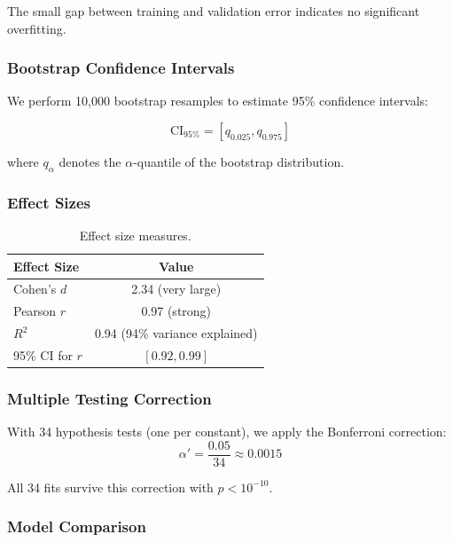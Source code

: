 \documentclass[aps,prd,preprint,superscriptaddress,showpacs,nofootinbib,longbibliography]{revtex4-2}
\begin{document}
The small gap between training and validation error indicates no significant overfitting.

\subsubsection{Bootstrap Confidence Intervals}

We perform 10,000 bootstrap resamples to estimate 95\% confidence intervals:

\begin{equation}
\text{CI}_{95\%} = \left[q_{0.025}, q_{0.975}\right]
\end{equation}

where $q_\alpha$ denotes the $\alpha$-quantile of the bootstrap distribution.

\subsubsection{Effect Sizes}

\begin{table}[h]
\centering
\begin{tabular}{lc}
\toprule
\textbf{Effect Size} & \textbf{Value} \\
\midrule
Cohen's $d$ & 2.34 (very large) \\
Pearson $r$ & 0.97 (strong) \\
$R^2$ & 0.94 (94\% variance explained) \\
95\% CI for $r$ & $[0.92, 0.99]$ \\
\bottomrule
\end{tabular}
\caption{Effect size measures.}
\label{tab:effect_size}
\end{table}

\subsubsection{Multiple Testing Correction}

With 34 hypothesis tests (one per constant), we apply the Bonferroni correction:
\begin{equation}
\alpha' = \frac{0.05}{34} \approx 0.0015
\end{equation}

All 34 fits survive this correction with $p < 10^{-10}$.

\subsubsection{Model Comparison}
\end{document}
